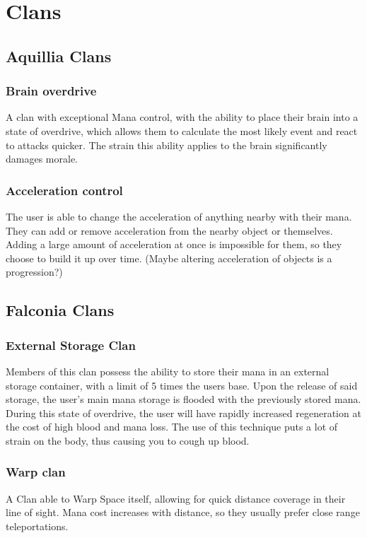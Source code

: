 \documentclass{report}
\begin{document}
            
    \section{ Clans}
        \subsection{Aquillia Clans}

        \subsubsection{Brain overdrive}
        A clan with exceptional Mana control, with the ability to place their brain into a state of overdrive, which allows them to 
        calculate the most likely event and react to attacks quicker. The strain this ability applies to the brain significantly damages morale.
        
        \subsubsection{Acceleration control}
        The user is able to change the acceleration of anything nearby with their mana. They can add or remove acceleration from the nearby object or themselves. Adding a large amount of acceleration at once is impossible for them, so they choose to build it up over time.
        (Maybe altering acceleration of objects is a progression?)

        
        
        \subsection{Falconia Clans}
        \subsubsection{External Storage Clan}
            Members of this clan possess the ability to store their mana in an external storage container, with a limit of 5 times the users base. Upon the release of said storage, the user's main mana storage is flooded with the previously stored mana. During this state of overdrive, the user will have rapidly increased regeneration at the cost of high blood and mana loss. The use of this technique puts a lot of strain on the body, thus causing you to cough up blood.

        \subsubsection{Warp clan}
            A Clan able to Warp Space itself, allowing for quick distance coverage in their line of sight. Mana cost increases with distance, so they usually prefer close range teleportations.
    
\end{document}
